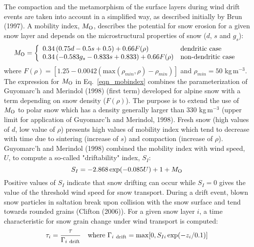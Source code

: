 The compaction and the metamorphism of the surface layers during wind
drift events are taken into account in a simplified way, as described
initially by Brun \etal (1997). A mobility index, $M_{\rm O} $,
describes the potential for snow erosion for a given snow layer and
depends on the microstructural properties of snow ($d$, $s$ and
$g_s$):
%
\begin{equation}
M_{\rm O} = \left\{
    \begin{array}{ll}
       0.34\left( 0.75 d-0.5s+0.5 \right) + 0.66F(\rho) & \mbox{dendritic case}\\
       0.34\left( -0.583 g_s-0.833s+0.833 \right) + 0.66 F(\rho)& \mbox{non-dendritic case}
    \end{array}
\right.\\
\label{eqn_mobindex}
\end{equation}
where $F(\rho)=\left[1.25-0.0042 \left(
    \mathrm{max}(\rho_{min},\rho)-\rho_{min} \right)\right]$ and
$\rho_{min}=50$ kg\,m$^{-3}$. The expression for $M_{\rm O}$ in
Eq.~\ref{eqn_mobindex} combines the parameterization of Guyomarc'h and
Merindol (1998)\nocite{guyomarch1998} (first term) developed for
alpine snow with a term depending on snow density ($F(\rho)$). The
purpose is to extend the use of $M_{\rm O}$ to polar snow which has a
density generally larger than 330 kg\,m$^{-3}$ (upper limit for
application of Guyomarc'h and Merindol, 1998). Fresh snow (high
values of $d$, low value of $\rho$) presents high values of mobility
index which tend to decrease with time due to sintering (increase of
$s$) and compaction (increase of $\rho$). Guyomarc'h and Merindol
(1998) combined the mobility index with wind speed, $U$, to compute a
so-called "driftability" index, $S_I$:
%
\begin{equation}
S_I = -2.868 \exp (-0.085U)+1+M_{\rm O}
\label{eqn_drifindex}
\end{equation}
Positive values of $S_I$ indicate that snow drifting can occur while
$S_I = 0$ gives the value of the threshold wind speed for snow
transport. During a drift event, blown snow particles in saltation
break upon collision with the snow surface and tend towards rounded
grains (Clifton \etal (2006)\nocite{Clifton2006}). For a given snow
layer $i$, a time characteristic for snow grain change under wind
transport is computed:
%
\begin{equation}
\tau_i = \frac{\tau}{\Gamma_{i~{\rm drift}}} \quad \mathrm{where}~\Gamma_{i~{\rm drift}} = \mathrm{max}[0,S_{Ii}\exp(-z_i/0.1)]
\label{eqn_to}
\end{equation}
